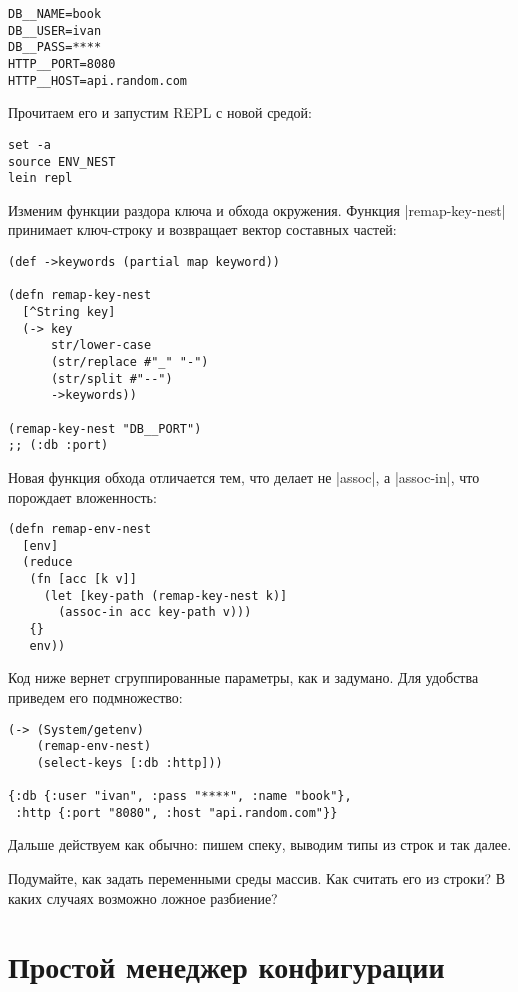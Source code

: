 \begin{verbatim}
DB__NAME=book
DB__USER=ivan
DB__PASS=****
HTTP__PORT=8080
HTTP__HOST=api.random.com
\end{verbatim}

\noindent
Прочитаем его и запустим REPL с новой средой:

\begin{verbatim}
set -a
source ENV_NEST
lein repl
\end{verbatim}

Изменим функции раздора ключа и обхода окружения. Функция
\spverb|remap-key-nest| принимает ключ-строку и возвращает вектор составных
частей:

\begin{verbatim}
(def ->keywords (partial map keyword))

(defn remap-key-nest
  [^String key]
  (-> key
      str/lower-case
      (str/replace #"_" "-")
      (str/split #"--")
      ->keywords))

(remap-key-nest "DB__PORT")
;; (:db :port)
\end{verbatim}

Новая функция обхода отличается тем, что делает не \spverb|assoc|, а
\spverb|assoc-in|, что порождает вложенность:

\begin{verbatim}
(defn remap-env-nest
  [env]
  (reduce
   (fn [acc [k v]]
     (let [key-path (remap-key-nest k)]
       (assoc-in acc key-path v)))
   {}
   env))
\end{verbatim}

Код ниже вернет сгруппированные параметры, как и задумано. Для удобства приведем
его подмножество:

\begin{verbatim}
(-> (System/getenv)
    (remap-env-nest)
    (select-keys [:db :http]))

{:db {:user "ivan", :pass "****", :name "book"},
 :http {:port "8080", :host "api.random.com"}}
\end{verbatim}

\noindent
Дальше действуем как обычно: пишем спеку, выводим типы из строк и так далее.

Подумайте, как задать переменными среды массив. Как считать его из строки? В
каких случаях возможно ложное разбиение?

\section{Простой менеджер конфигурации}

